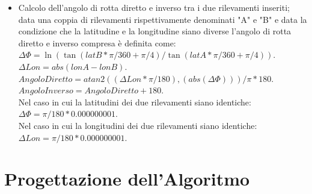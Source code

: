 \documentclass{article}
\begin{document}
\begin{itemize}
	\item Calcolo dell'angolo di rotta diretto e inverso tra i due rilevamenti inseriti; data una coppia di rilevamenti rispettivamente denominati "A" e "B" e data la condizione che la latitudine e la longitudine siano diverse l'angolo di rotta diretto e inverso compresa è definita come: \\
	$\Delta\Phi = \ln( \tan(latB * \pi / 360 + \pi / 4 ) / \tan(latA * \pi / 360 + \pi / 4 )). $\\
	$ \Delta Lon = abs(lonA - lonB). $ \\
	$ Angolo Diretto = atan2((\Delta Lon * \pi / 180), (abs(\Delta\Phi))) / \pi * 180.$\\
	$ Angolo Inverso = Angolo Diretto+ 180.$\\
	Nel caso in cui la latitudini dei due rilevamenti siano identiche:\\
	$\Delta\Phi = \pi / 180 * 0.000000001.$\\
	Nel caso in cui la longitudini dei due rilevamenti siano identiche:\\
	$\Delta Lon = \pi / 180 * 0.000000001.$\\
\end{itemize}
\newpage

\section{Progettazione dell'Algoritmo}
\end{document}

